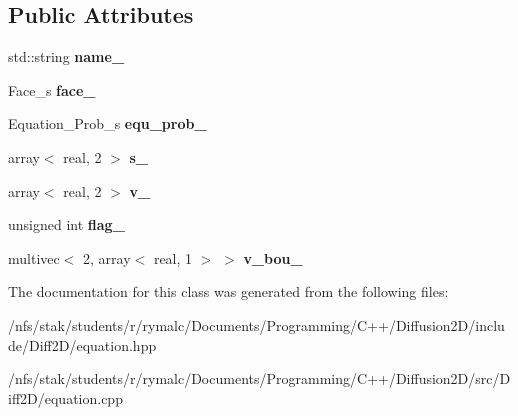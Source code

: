 \subsection*{Public Attributes}
\begin{DoxyCompactItemize}
\item 
\hypertarget{classEquation_a2bbb65c98ebf1345231370e93b504037}{
std::string {\bfseries name\_\-}}
\label{classEquation_a2bbb65c98ebf1345231370e93b504037}

\item 
\hypertarget{classEquation_a9eeeceed0d8130fd30fb2e65f3b15f3f}{
Face\_\-s {\bfseries face\_\-}}
\label{classEquation_a9eeeceed0d8130fd30fb2e65f3b15f3f}

\item 
\hypertarget{classEquation_a1ece93bf1c58eb22001327da69ab73fc}{
Equation\_\-Prob\_\-s {\bfseries equ\_\-prob\_\-}}
\label{classEquation_a1ece93bf1c58eb22001327da69ab73fc}

\item 
\hypertarget{classEquation_ac7f793f3b1e3694b719d91d884460880}{
array$<$ real, 2 $>$ {\bfseries s\_\-}}
\label{classEquation_ac7f793f3b1e3694b719d91d884460880}

\item 
\hypertarget{classEquation_aa48c28c116aec278f7713a414dec6196}{
array$<$ real, 2 $>$ {\bfseries v\_\-}}
\label{classEquation_aa48c28c116aec278f7713a414dec6196}

\item 
\hypertarget{classEquation_a1820f1ab792e83981456fce5dda492b9}{
unsigned int {\bfseries flag\_\-}}
\label{classEquation_a1820f1ab792e83981456fce5dda492b9}

\item 
\hypertarget{classEquation_ab4039b291316d3a42c43330e868b4f50}{
multivec$<$ 2, array$<$ real, 1 $>$ $>$ {\bfseries v\_\-bou\_\-}}
\label{classEquation_ab4039b291316d3a42c43330e868b4f50}

\end{DoxyCompactItemize}


The documentation for this class was generated from the following files:\begin{DoxyCompactItemize}
\item 
/nfs/stak/students/r/rymalc/Documents/Programming/C++/Diffusion2D/include/Diff2D/equation.hpp\item 
/nfs/stak/students/r/rymalc/Documents/Programming/C++/Diffusion2D/src/Diff2D/equation.cpp\end{DoxyCompactItemize}
